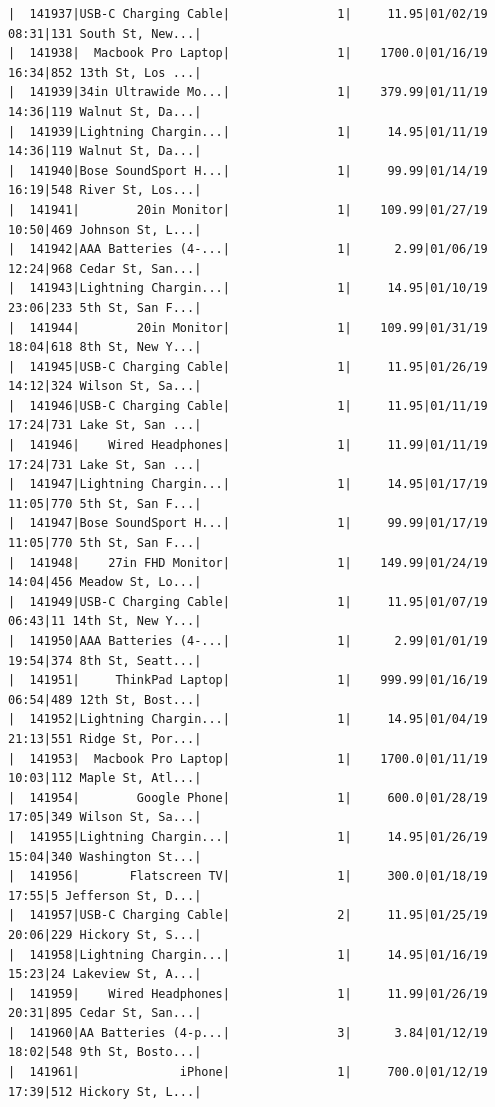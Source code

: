 \documentclass[
  letterpaper,
  DIV=11,
  numbers=noendperiod]{scrartcl}
\begin{document}
\begin{verbatim}
|  141937|USB-C Charging Cable|               1|     11.95|01/02/19 08:31|131 South St, New...|
|  141938|  Macbook Pro Laptop|               1|    1700.0|01/16/19 16:34|852 13th St, Los ...|
|  141939|34in Ultrawide Mo...|               1|    379.99|01/11/19 14:36|119 Walnut St, Da...|
|  141939|Lightning Chargin...|               1|     14.95|01/11/19 14:36|119 Walnut St, Da...|
|  141940|Bose SoundSport H...|               1|     99.99|01/14/19 16:19|548 River St, Los...|
|  141941|        20in Monitor|               1|    109.99|01/27/19 10:50|469 Johnson St, L...|
|  141942|AAA Batteries (4-...|               1|      2.99|01/06/19 12:24|968 Cedar St, San...|
|  141943|Lightning Chargin...|               1|     14.95|01/10/19 23:06|233 5th St, San F...|
|  141944|        20in Monitor|               1|    109.99|01/31/19 18:04|618 8th St, New Y...|
|  141945|USB-C Charging Cable|               1|     11.95|01/26/19 14:12|324 Wilson St, Sa...|
|  141946|USB-C Charging Cable|               1|     11.95|01/11/19 17:24|731 Lake St, San ...|
|  141946|    Wired Headphones|               1|     11.99|01/11/19 17:24|731 Lake St, San ...|
|  141947|Lightning Chargin...|               1|     14.95|01/17/19 11:05|770 5th St, San F...|
|  141947|Bose SoundSport H...|               1|     99.99|01/17/19 11:05|770 5th St, San F...|
|  141948|    27in FHD Monitor|               1|    149.99|01/24/19 14:04|456 Meadow St, Lo...|
|  141949|USB-C Charging Cable|               1|     11.95|01/07/19 06:43|11 14th St, New Y...|
|  141950|AAA Batteries (4-...|               1|      2.99|01/01/19 19:54|374 8th St, Seatt...|
|  141951|     ThinkPad Laptop|               1|    999.99|01/16/19 06:54|489 12th St, Bost...|
|  141952|Lightning Chargin...|               1|     14.95|01/04/19 21:13|551 Ridge St, Por...|
|  141953|  Macbook Pro Laptop|               1|    1700.0|01/11/19 10:03|112 Maple St, Atl...|
|  141954|        Google Phone|               1|     600.0|01/28/19 17:05|349 Wilson St, Sa...|
|  141955|Lightning Chargin...|               1|     14.95|01/26/19 15:04|340 Washington St...|
|  141956|       Flatscreen TV|               1|     300.0|01/18/19 17:55|5 Jefferson St, D...|
|  141957|USB-C Charging Cable|               2|     11.95|01/25/19 20:06|229 Hickory St, S...|
|  141958|Lightning Chargin...|               1|     14.95|01/16/19 15:23|24 Lakeview St, A...|
|  141959|    Wired Headphones|               1|     11.99|01/26/19 20:31|895 Cedar St, San...|
|  141960|AA Batteries (4-p...|               3|      3.84|01/12/19 18:02|548 9th St, Bosto...|
|  141961|              iPhone|               1|     700.0|01/12/19 17:39|512 Hickory St, L...|

\end{verbatim}
\end{document}
